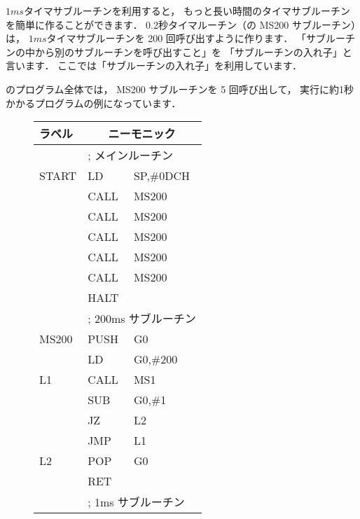 
$1ms$タイマサブルーチンを利用すると，
もっと長い時間のタイマサブルーチンを簡単に作ることができます．
0.2秒タイマルーチン（の MS200 サブルーチン）は，
$1ms$タイマサブルーチンを 200 回呼び出すように作ります．
「サブルーチンの中から別のサブルーチンを呼び出すこと」を
「サブルーチンの入れ子」と言います．
ここでは「サブルーチンの入れ子」を利用しています．

のプログラム全体では，
MS200 サブルーチンを 5 回呼び出して，
実行に約1秒かかるプログラムの例になっています．

\begin{figure}[btp]
{\small\tt\begin{center}
\begin{tabular}{|l|l l|} \hline
ラベル & \multicolumn{2}{|c|}{ニーモニック}        \\
\hline
      & \multicolumn{2}{|l|}{; メインルーチン}     \\
START & LD   & SP,\#0DCH                           \\
      & CALL & MS200                               \\
      & CALL & MS200                               \\
      & CALL & MS200                               \\
      & CALL & MS200                               \\
      & CALL & MS200                               \\
      & HALT &                                     \\
      & \multicolumn{2}{|l|}{; 200ms サブルーチン} \\
MS200 & PUSH & G0                                  \\
      & LD   & G0,\#200                            \\
L1    & CALL & MS1                                 \\
      & SUB  & G0,\#1                              \\
      & JZ   & L2                                  \\
      & JMP  & L1                                  \\
L2    & POP  & G0                                  \\
      & RET  &                                     \\
      & \multicolumn{2}{|l|}{; 1ms サブルーチン}   \\

\end{tabular}
\end{center}}
\end{figure}
